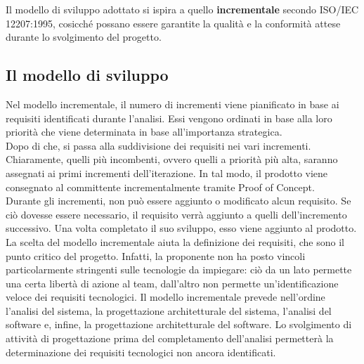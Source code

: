 Il modello di sviluppo adottato si ispira a quello \textbf{incrementale} secondo ISO/IEC 12207:1995, cosicché possano essere garantite la qualità e la conformità attese durante lo svolgimento del progetto.

\subsection{Il modello di sviluppo}
Nel modello incrementale, il numero di incrementi viene pianificato in base ai requisiti identificati durante l'analisi. Essi vengono ordinati in base alla loro priorità che viene determinata in base all'importanza strategica.\\
Dopo di che, si passa alla suddivisione dei requisiti nei vari incrementi. Chiaramente, quelli più incombenti, ovvero quelli a priorità più alta, saranno assegnati ai primi incrementi dell'iterazione. In tal modo, il prodotto viene consegnato al committente incrementalmente tramite Proof of Concept.\\
Durante gli incrementi, non può essere aggiunto o modificato alcun requisito. Se ciò dovesse essere necessario, il requisito verrà aggiunto a quelli dell'incremento successivo. Una volta completato il suo sviluppo, esso viene aggiunto al prodotto.\\
La scelta del modello incrementale aiuta la definizione dei requisiti, che sono il punto critico del progetto. Infatti, la proponente non ha posto vincoli particolarmente stringenti sulle tecnologie da impiegare: ciò da un lato permette una certa libertà di azione al team, dall'altro non permette un'identificazione veloce dei requisiti tecnologici. Il modello incrementale prevede nell'ordine l'analisi del sistema, la progettazione architetturale del sistema, l'analisi del software e, infine, la progettazione architetturale del software. Lo svolgimento di attività di progettazione prima del completamento dell'analisi permetterà la determinazione dei requisiti tecnologici non ancora identificati.

